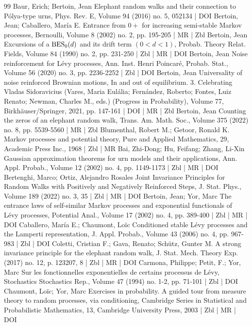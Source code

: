 \documentclass[10pt]{amsart}
\theoremstyle{definition}\newtheorem{defi}[theo]{Definition}\newtheorem{rema}[theo]{Remark}\newtheorem{exam}[theo]{Example}\newtheorem{exem}[theo]{Example}\newtheorem{nota}[theo]{Notation}
\begin{document}
\begin{thebibliography}{99}
Baur, Erich; Bertoin, Jean Elephant random walks and their connection to Pólya-type urns, Phys. Rev. E, Volume 94 (2016) no. 5, 052134 | DOI
Bertoin, Jean; Caballero, María E. Entrance from $0+$ for increasing semi-stable Markov processes, Bernoulli, Volume 8 (2002) no. 2, pp. 195-205 | MR | Zbl
Bertoin, Jean Excursions of a ${\rm {BES}}_0(d)$ and its drift term $(0<d<1)$, Probab. Theory Relat. Fields, Volume 84 (1990) no. 2, pp. 231-250 | Zbl | MR | DOI
Bertoin, Jean Noise reinforcement for Lévy processes, Ann. Inst. Henri Poincaré, Probab. Stat., Volume 56 (2020) no. 3, pp. 2236-2252 | Zbl | DOI
Bertoin, Jean Universality of noise reinforced Brownian motions, In and out of equilibrium. 3. Celebrating Vladas Sidoravicius (Vares, Maria Eulália; Fernández, Roberto; Fontes, Luiz Renato; Newman, Charles M., eds.) (Progress in Probability), Volume 77, Birkhäuser/Springer, 2021, pp. 147-161 | DOI | MR | Zbl
Bertoin, Jean Counting the zeros of an elephant random walk, Trans. Am. Math. Soc., Volume 375 (2022) no. 8, pp. 5539-5560 | MR | Zbl
Blumenthal, Robert M.; Getoor, Ronald K. Markov processes and potential theory, Pure and Applied Mathematics, 29, Academic Press Inc., 1968 | Zbl | MR
Bai, Zhi-Dong; Hu, Feifang; Zhang, Li-Xin Gaussian approximation theorems for urn models and their applications, Ann. Appl. Probab., Volume 12 (2002) no. 4, pp. 1149-1173 | Zbl | MR | DOI
Bertenghi, Marco; Ortiz, Alejandro Rosales Joint Invariance Principles for Random Walks with Positively and Negatively Reinforced Steps, J. Stat. Phys., Volume 189 (2022) no. 3, 35 | Zbl | MR | DOI
Bertoin, Jean; Yor, Marc The entrance laws of self-similar Markov processes and exponential functionals of Lévy processes, Potential Anal., Volume 17 (2002) no. 4, pp. 389-400 | Zbl | MR | DOI
Caballero, María E.; Chaumont, Loïc Conditioned stable Lévy processes and the Lamperti representation, J. Appl. Probab., Volume 43 (2006) no. 4, pp. 967-983 | Zbl | DOI
Coletti, Cristian F.; Gava, Renato; Schütz, Gunter M. A strong invariance principle for the elephant random walk, J. Stat. Mech. Theory Exp. (2017) no. 12, p. 123207, 8 | Zbl | MR | DOI
Carmona, Philippe; Petit, F.; Yor, Marc Sur les fonctionnelles exponentielles de certains processus de Lévy, Stochastics Stochastics Rep., Volume 47 (1994) no. 1-2, pp. 71-101 | Zbl | DOI
Chaumont, Loïc; Yor, Marc Exercises in probability. A guided tour from measure theory to random processes, via conditioning, Cambridge Series in Statistical and Probabilistic Mathematics, 13, Cambridge University Press, 2003 | Zbl | MR | DOI

\end{thebibliography}
\end{document}
